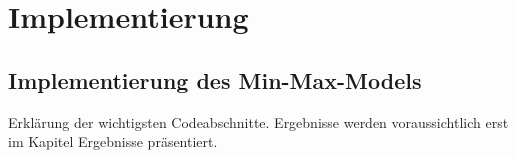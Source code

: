 \chapter{Implementierung}
\section{Implementierung des Min-Max-Models}
Erklärung der wichtigsten Codeabschnitte.
Ergebnisse werden voraussichtlich erst im Kapitel Ergebnisse präsentiert.